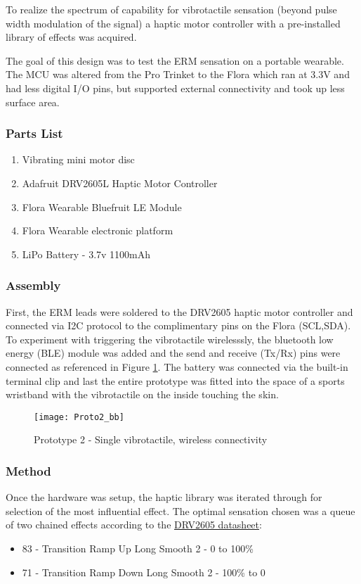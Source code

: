 To realize the spectrum of capability for vibrotactile sensation (beyond pulse width modulation of the signal) a haptic motor controller with a pre-installed library of effects was acquired. 

The goal of this design was to test the ERM sensation on a portable wearable. The MCU was altered from the Pro Trinket to the Flora which ran at 3.3V and had less digital I/O pins, but supported external connectivity and took up less surface area.

\subsubsection{Parts List}
\begin{enumerate}
    \item Vibrating mini motor disc
    \item Adafruit DRV2605L Haptic Motor Controller
    \item Flora Wearable Bluefruit LE Module
    \item Flora Wearable electronic platform
    \item LiPo Battery - 3.7v 1100mAh
\end{enumerate}
\subsubsection{Assembly}
    First, the ERM leads were soldered to the DRV2605 haptic motor controller and connected via I2C protocol to the complimentary pins on the Flora (SCL,SDA).
    To experiment with triggering the vibrotactile wirelesssly, the bluetooth low energy (BLE) module was added and the send and receive (Tx/Rx) pins were connected as referenced in Figure \ref{fig:Proto2}. The battery was connected via the built-in terminal clip and last the entire prototype was fitted into the space of a sports wristband with the vibrotactile on the inside touching the skin.

    \begin{figure}[H]
        \texttt{[image: Proto2\_bb]}
        \caption{Prototype 2 - Single vibrotactile, wireless connectivity}
        \label{fig:Proto2}
    \end{figure}

\subsubsection{Method}
    Once the hardware was setup, the haptic library was iterated through for selection of the most influential effect. The optimal sensation chosen was a queue of two chained effects according to the \underline{DRV2605 datasheet}\cite{Adafruit}:
    \begin{itemize}
        \item 83 - Transition Ramp Up Long Smooth 2 - 0 to 100\%
        \item 71 - Transition Ramp Down Long Smooth 2 - 100\% to 0
    \end{itemize}

